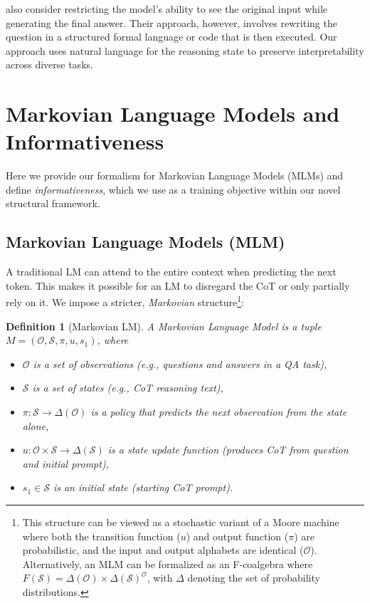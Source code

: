 \documentclass{article} %
\newtheorem{definition}{Definition}[section]
\begin{document}
\citet{lyu2023faithful} also consider restricting the model's ability to see the original input while generating the final answer. Their approach, however, involves rewriting the question in a structured formal language or code that is then executed. Our approach uses natural language for the reasoning state to preserve interpretability across diverse tasks.

\section{Markovian Language Models and Informativeness}
\label{sec:MLM}

Here we provide our formalism for Markovian Language Models (MLMs) and define \emph{informativeness}, which we use as a training objective within our novel structural framework.

\subsection{Markovian Language Models (MLM)}

A traditional LM can attend to the entire context when predicting the next token. This makes it possible for an LM to disregard the CoT or only partially rely on it. We impose a stricter, \emph{Markovian} structure\footnote{This structure can be viewed as a stochastic variant of a Moore machine where both the transition function ($u$) and output function ($\pi$) are probabilistic, and the input and output alphabets are identical ($\mathcal{O}$). Alternatively, an MLM can be formalized as an F-coalgebra where $F(\mathcal{S}) = \Delta(\mathcal{O}) \times \Delta(\mathcal{S})^{\mathcal{O}}$, with $\Delta$ denoting the set of probability distributions.}:
\begin{definition}[Markovian LM]
A Markovian Language Model is a tuple $M=(\mathcal{O}, \mathcal{S}, \pi, u, s_1)$, where
\begin{itemize}
\item $\mathcal{O}$ is a set of observations (e.g., questions and answers in a QA task),
\item $\mathcal{S}$ is a set of states (e.g., CoT reasoning text),
\item $\pi: \mathcal{S}\rightarrow \Delta(\mathcal{O})$ is a policy that predicts the next observation from the state alone,
\item $u: \mathcal{O}\times\mathcal{S}\rightarrow \Delta(\mathcal{S})$ is a state update function (produces CoT from question and initial prompt),
\item $s_1\in \mathcal{S}$ is an initial state (starting CoT prompt).
\end{itemize}
\end{definition}
\end{document}
